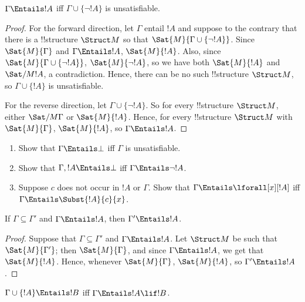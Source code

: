 \documentclass[../../include/open-logic-section]{subfiles}
\begin{document}
\begin{prop}
$\Gamma \Entails !A$ iff $\Gamma \cup \{\lnot !A\}$ is unsatisfiable.
\end{prop}

\begin{proof}
For the forward direction, let $\Gamma$ entail $!A$ and suppose to the
contrary that there is a !!{structure} $\Struct M$ so that $\Sat{M}{\Gamma
  \cup \{ \lnot !A \}}$. Since $\Sat{M}{\Gamma}$ and $\Gamma \Entails
!A$, $\Sat{M}{!A}$. Also, since $\Sat{M}{\Gamma\cup \{ \lnot !A \}}$,
$\Sat{M}{\lnot !A}$, so we have both $\Sat{M}{!A}$ and $\Sat/{M}{!A}$,
a contradiction. Hence, there can be no such !!{structure} $\Struct M$, so
$\Gamma \cup \{ !A \}$ is unsatisfiable.

For the reverse direction, let $\Gamma \cup \{ \lnot !A \}$. So for
every !!{structure} $\Struct M$, either $\Sat/{M}{\Gamma}$ or
$\Sat{M}{!A}$. Hence, for every !!{structure} $\Struct M$ with
$\Sat{M}{\Gamma}$, $\Sat{M}{!A}$, so $\Gamma \Entails !A$.
\end{proof}

\begin{prob}
\begin{enumerate}
\item Show that $\Gamma \Entails \bot$ iff $\Gamma$ is unsatisfiable.
\item Show that $\Gamma, !A \Entails \bot$ iff $\Gamma \Entails \lnot !A$.
\item Suppose $c$ does not occur in $!A$ or $\Gamma$.  Show that
  $\Gamma \Entails \lforall[x][!A]$ iff $\Gamma \Entails
  \Subst{!A}{c}{x}$.
\end{enumerate}
\end{prob}


\begin{prop}
If $\Gamma \subseteq \Gamma'$ and $\Gamma \Entails !A$, then $\Gamma'
\Entails !A$.
\end{prop}

\begin{proof}
Suppose that $\Gamma \subseteq \Gamma'$ and $\Gamma \Entails !A$. Let
$\Struct M$ be such that $\Sat{M}{\Gamma'}$; then $\Sat{M}{\Gamma}$,
and since $\Gamma \Entails !A$, we get that $\Sat{M}{!A}$. Hence,
whenever $\Sat{M}{\Gamma}$, $\Sat{M}{!A}$, so $\Gamma' \Entails !A$.
\end{proof}


\begin{thm}
$\Gamma \cup \{!A\} \Entails !B$ iff $\Gamma \Entails !A \lif !B$.
\end{thm}
\end{document}

